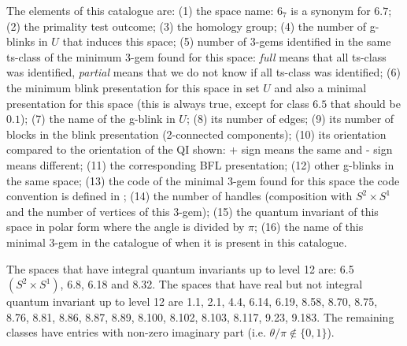 The elements of this catalogue are: (1) the space name: $6_7$ is
a synonym for $6.7$; (2) the primality test outcome; (3) the homology
group; (4) the number of g-blinks in $U$ that induces this space; (5) number
of 3-gems identified in the same ts-class of the minimum 3-gem
found for this space: {\it full} means that all ts-class
was identified, {\it partial} means that we do not know if
all ts-class was identified; (6) the minimum blink
presentation for this space in set $U$ and also a
minimal presentation for this space (this is always true,
except for class $6.5$ that should be $0.1$); (7) the name
of the g-blink in $U$; (8) its number of edges; (9) its number
of blocks in the blink presentation (2-connected components);
(10) its orientation compared to the orientation of the QI shown:
+ sign means the same and - sign means different; (11) the
corresponding BFL presentation; (12) other g-blinks in the
same space; (13) the code of the minimal 3-gem found for
this space the code convention is defined in \cite{Lins1995};
 (14) the number of handles (composition with
$S^2 \times S^1$ and the number of vertices of this 3-gem); (15)
the quantum invariant of this space in polar form where the
angle is divided by $\pi$; (16) the name of this minimal
3-gem in the catalogue of \cite{Lins1995} when it is present
in this catalogue.

The spaces that have integral quantum invariants up to level 12 are:
6.5 $(S^2 \times S^1)$, 6.8, 6.18 and 8.32. The spaces that have real but not integral
quantum invariant up to level 12 are 1.1, 2.1, 4.4, 6.14, 6.19, 8.58,
8.70, 8.75, 8.76, 8.81, 8.86, 8.87, 8.89, 8.100, 8.102, 8.103, 8.117,
9.23, 9.183. The remaining classes have entries with non-zero imaginary
part (i.e. $\theta/\pi \notin \{0, 1\}$).



